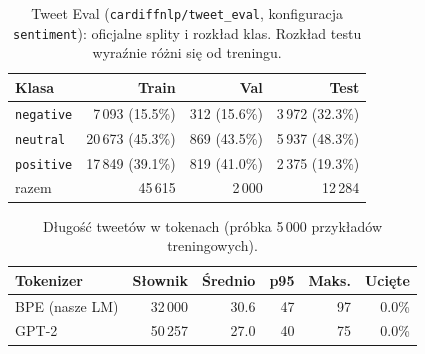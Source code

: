 \begin{table}[H]
\centering
\small
\caption{Tweet Eval (\texttt{cardiffnlp/tweet\_eval}, konfiguracja \texttt{sentiment}): oficjalne splity i rozkład klas. Rozkład testu wyraźnie różni się od treningu.}
\label{tab:cls-data}
\begin{tabular}{@{}lrrr@{}}
\toprule
Klasa & Train & Val & Test \\
\midrule
\texttt{negative} & 7\,093 (15.5\%) & 312 (15.6\%) & 3\,972 (32.3\%) \\
\texttt{neutral} & 20\,673 (45.3\%) & 869 (43.5\%) & 5\,937 (48.3\%) \\
\texttt{positive} & 17\,849 (39.1\%) & 819 (41.0\%) & 2\,375 (19.3\%) \\
\midrule
razem & 45\,615 & 2\,000 & 12\,284 \\
\bottomrule
\end{tabular}
\end{table}
\begin{table}[H]
\centering
\small
\caption{Długość tweetów w tokenach (próbka 5\,000 przykładów treningowych).}
\label{tab:cls-tokens}
\begin{tabular}{@{}lrrrrr@{}}
\toprule
Tokenizer & Słownik & Średnio & p95 & Maks. & Ucięte \\
\midrule
BPE (nasze LM) & 32\,000 & 30.6 & 47 & 97 & 0.0\% \\
GPT-2 & 50\,257 & 27.0 & 40 & 75 & 0.0\% \\
\bottomrule
\end{tabular}
\end{table}
